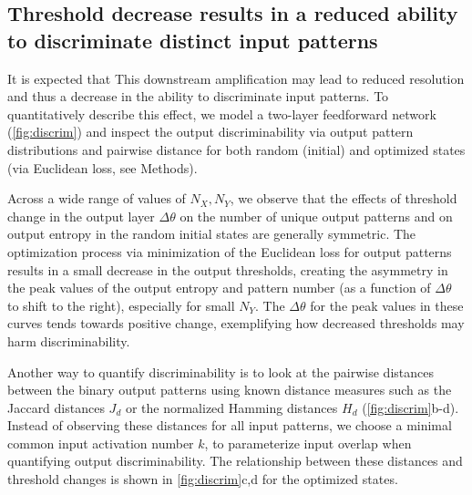 \subsection{Threshold decrease results in a reduced ability to discriminate distinct input patterns}
It is expected that
    This downstream amplification may lead to reduced resolution
        and thus a decrease in the ability to discriminate input patterns.
    To quantitatively describe this effect, we model a two-layer feedforward network (\autoref{fig:discrim})
        and inspect the output discriminability via output pattern distributions
        and pairwise distance for both random (initial) and optimized states (via Euclidean loss, see Methods).

Across a wide range of values of $N_X, N_Y$, we observe that
        the effects of threshold change in the output layer $\Delta \theta$
        on the number of unique output patterns and on output entropy
        in the random initial states
        are generally symmetric.
    The optimization process via minimization of the Euclidean loss for output patterns
        results in a small decrease in the output thresholds,
        creating the asymmetry in the peak values of the output entropy and pattern number
            (as a function of $\Delta \theta$ to shift to the right),
        especially for small $N_Y$.
    The $\Delta \theta$ for the peak values in these curves tends towards positive change,
        exemplifying how decreased thresholds may harm discriminability.



Another way to quantify discriminability is to look at the pairwise distances between the binary output patterns
        using known distance measures such as
            the Jaccard distances $J_d$
            or the normalized Hamming distances $H_d$
            (\autoref{fig:discrim}b-d).
    Instead of observing these distances for all input patterns, we choose
        a minimal common input activation number $k$,
        to parameterize input overlap when quantifying output discriminability.
    The relationship between these distances and threshold changes is shown in \autoref{fig:discrim}c,d for the optimized states.

